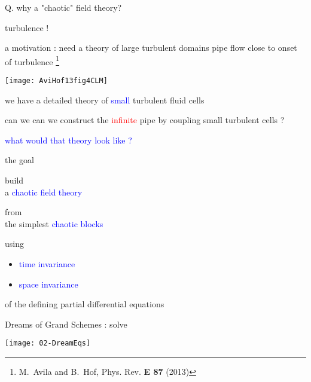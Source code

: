 \begin{frame}{Q. why a "chaotic" field theory?}
\vfill
\begin{center}
{\huge turbulence !}
\end{center}
\vfill
\end{frame} %

\begin{frame}{a motivation : need a theory of {\Huge large} turbulent domains}
pipe flow close to onset of turbulence
\footnote{M.~Avila and B.~Hof, {Phys. Rev. \bf E 87} (2013)}
\begin{center}
\texttt{[image: AviHof13fig4CLM]}
\end{center}
we have a detailed theory of {\small \textcolor{blue}{small}} turbulent fluid cells

\bigskip

can we can we construct the \textcolor{red}{infinite} pipe by coupling small turbulent cells ?
\bigskip

\textcolor{blue}{what would that theory look like ?}
\end{frame} %


\begin{frame}{the goal}
\vfill

\begin{center}
{\Large build
\\
a \textcolor{blue}{chaotic field theory}
\medskip

from
\\
the simplest \textcolor{blue}{chaotic blocks}
}
\end{center}

\vfill
using
\begin{itemize}
  \item
\textcolor{blue}{time invariance}
  \item
\textcolor{blue}{space invariance}
\end{itemize}
 of the defining partial differential equations
\end{frame} %

\begin{frame}{Dreams of Grand Schemes : solve}
 \begin{center}
   \texttt{[image: 02-DreamEqs]}
 \end{center}
\end{frame}

